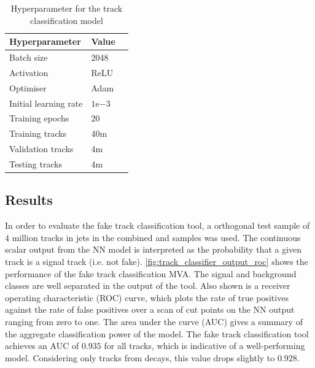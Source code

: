 \begin{table}[!htbp]
  \footnotesize\centering
  \setlength{\tabcolsep}{0.5em} %
  \begin{tabular}{lll}
      \toprule\hline
      \textbf{Hyperparameter} & \textbf{Value} \\
      \hline
      Batch size & 2048 \\
      Activation & ReLU \\
      Optimiser & Adam \\
      Initial learning rate & $1\text{e}{-3}$ \\
      Training epochs & 20 \\
      Training tracks & 40m \\
      Validation tracks & 4m \\
      Testing tracks & 4m \\
      \hline\bottomrule
  \end{tabular}
  \caption{
    Hyperparameter for the track classification model
  }
  \label{tab:fake_track_mva_hyperparams}
\end{table}


\subsection{Results}\label{sec:fake_track_mva_results}


In order to evaluate the fake track classification tool, a orthogonal test sample of $4$ million tracks in jets in the combined \ttbar and \Zprime samples was used.
The continuous scalar output from the NN model is interpreted as the probability that a given track is a signal track (i.e. not fake).
\cref{fig:track_classifier_output_roc} shows the performance of the fake track classification MVA. The signal and background classes are well separated in the output of the tool.
Also shown is a receiver operating characteristic (ROC) curve, which plots the rate of true positives against the rate of false positives over a scan of cut points on the NN output ranging from zero to one.
The area under the curve (AUC) gives a summary of the aggregate classification power of the model.
The fake track classification tool achieves an AUC of $0.935$ for all tracks, which is indicative of a well-performing model.
Considering only tracks from \bhadron decays, this value drops slightly to $0.928$. 


